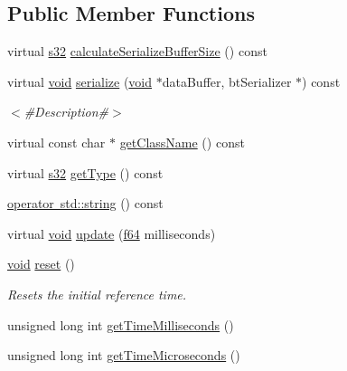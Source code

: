 \subsection*{Public Member Functions}
\begin{DoxyCompactItemize}
\item 
virtual \mbox{\hyperlink{_util_8h_aa62c75d314a0d1f37f79c4b73b2292e2}{s32}} \mbox{\hyperlink{classnjli_1_1_clock_a23843e93992d802b41cab9c2af6d8b93}{calculate\+Serialize\+Buffer\+Size}} () const
\item 
virtual \mbox{\hyperlink{_thread_8h_af1e856da2e658414cb2456cb6f7ebc66}{void}} \mbox{\hyperlink{classnjli_1_1_clock_a8c6f081b125f65ae45ee0bfd7ef85138}{serialize}} (\mbox{\hyperlink{_thread_8h_af1e856da2e658414cb2456cb6f7ebc66}{void}} $\ast$data\+Buffer, bt\+Serializer $\ast$) const
\begin{DoxyCompactList}\small\item\em $<$\#\+Description\#$>$ \end{DoxyCompactList}\item 
virtual const char $\ast$ \mbox{\hyperlink{classnjli_1_1_clock_a54952cf183ca49429004733aad6b3fd1}{get\+Class\+Name}} () const
\item 
virtual \mbox{\hyperlink{_util_8h_aa62c75d314a0d1f37f79c4b73b2292e2}{s32}} \mbox{\hyperlink{classnjli_1_1_clock_a403ec7bf5455930215121622d0324fb4}{get\+Type}} () const
\item 
\mbox{\hyperlink{classnjli_1_1_clock_a389d95316793c9fc113b625d92040d53}{operator std\+::string}} () const
\item 
virtual \mbox{\hyperlink{_thread_8h_af1e856da2e658414cb2456cb6f7ebc66}{void}} \mbox{\hyperlink{classnjli_1_1_clock_aacf123c98c4ff46f5716b488423de72b}{update}} (\mbox{\hyperlink{_util_8h_a94dab5770726ccbef8c7d026cfbdf8e5}{f64}} milliseconds)
\item 
\mbox{\hyperlink{_thread_8h_af1e856da2e658414cb2456cb6f7ebc66}{void}} \mbox{\hyperlink{classnjli_1_1_clock_ad318ac6f8c34fa8796dfe6156cbb1824}{reset}} ()
\begin{DoxyCompactList}\small\item\em Resets the initial reference time. \end{DoxyCompactList}\item 
unsigned long int \mbox{\hyperlink{classnjli_1_1_clock_af5585917dc19bff0dd795e7a86bb0bef}{get\+Time\+Milliseconds}} ()
\item 
unsigned long int \mbox{\hyperlink{classnjli_1_1_clock_ac1debc5f875f6011e082d93037127870}{get\+Time\+Microseconds}} ()

\end{DoxyCompactItemize}
